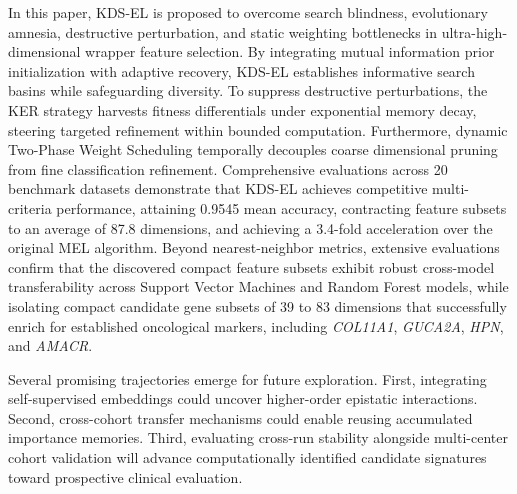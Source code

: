 In this paper, KDS-EL is proposed to overcome search blindness, evolutionary amnesia, destructive perturbation, and static weighting bottlenecks in ultra-high-dimensional wrapper feature selection. By integrating mutual information prior initialization with adaptive recovery, KDS-EL establishes informative search basins while safeguarding diversity. To suppress destructive perturbations, the KER strategy harvests fitness differentials under exponential memory decay, steering targeted refinement within bounded computation. Furthermore, dynamic Two-Phase Weight Scheduling temporally decouples coarse dimensional pruning from fine classification refinement. Comprehensive evaluations across 20 benchmark datasets demonstrate that KDS-EL achieves competitive multi-criteria performance, attaining 0.9545 mean accuracy, contracting feature subsets to an average of 87.8 dimensions, and achieving a 3.4-fold acceleration over the original MEL algorithm. Beyond nearest-neighbor metrics, extensive evaluations confirm that the discovered compact feature subsets exhibit robust cross-model transferability across Support Vector Machines and Random Forest models, while isolating compact candidate gene subsets of 39 to 83 dimensions that successfully enrich for established oncological markers, including \textit{COL11A1}, \textit{GUCA2A}, \textit{HPN}, and \textit{AMACR}.

Several promising trajectories emerge for future exploration. First, integrating self-supervised embeddings could uncover higher-order epistatic interactions. Second, cross-cohort transfer mechanisms could enable reusing accumulated importance memories. Third, evaluating cross-run stability alongside multi-center cohort validation will advance computationally identified candidate signatures toward prospective clinical evaluation.
